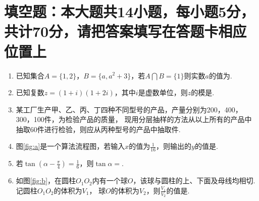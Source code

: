 \documentclass[12pt,space]{ctexart} %
\begin{document}
\section{填空题：本大题共14小题，每小题5分，共计70分，请把答案填写在答题卡相应位置上}
\begin{enumerate}[itemsep=-0.3em,topsep=0pt]
  \item 已知集合$A=\{1,2\}$，$B=\{a,a^2+3\}$，若$A\bigcap B = \{1\}$则实数$a$的值为.
  \item 已知复数$z=(1+i)(1+2i)$，其中$i$是虚数单位，则$z$的模是.
  \item 某工厂生产甲、乙、丙、丁四种不同型号的产品，产量分别为200，400，300，100件，为检验产品的质量，
        现用分层抽样的方法从以上所有的产品中抽取$60$件进行检验，则应从丙种型号的产品中抽取件.
  \item 图\ref{fig:a}是一个算法流程图，若输入$x$的值为$\displaystyle{\frac{1}{16}}$，则输出的$y$的值是.
  \item 若$\displaystyle{\tan(\alpha-\frac{\pi}{4})=\frac{1}{6}}$，则$\tan\alpha=$.
  \item 如图\ref{fig:b}，在圆柱$O_1O_2$内有一个球$O$，该球与圆柱的上、下面及母线均相切. 记圆柱$O_1O_2$的体积为$V_1$，
        球$O$的体积为$V_2$，则$\displaystyle{\frac{V_1}{V_2}}$的值是.
  

\end{enumerate}
\end{document}
